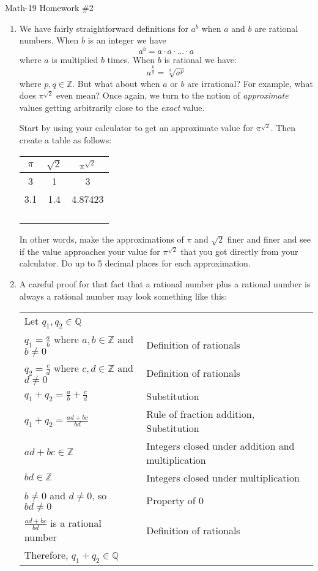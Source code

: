 \documentclass[letterpaper,12pt,fleqn]{article}
\begin{document}
\begin{center}
\Large Math-19 Homework \#2
\end{center}

\vspace{0.5in}

\begin{enumerate}
\item We have fairly straightforward definitions for $a^b$ when $a$ and $b$ are
rational numbers. When $b$ is an integer we have
\[a^b=a\cdot a\cdot \ldots \cdot a\]
where $a$ is multiplied $b$ times. When $b$ is rational we have:
\[a^{\frac{p}{q}}=\sqrt[q]{a^p}\]
where $p,q\in\mathbb{Z}$. But what about when $a$ or $b$ are irrational? For
example, what does $\pi^{\sqrt{2}}$ even mean? Once again, we turn to the notion
of \emph{approximate} values getting arbitrarily close to the \emph{exact}
value.

Start by using your calculator to get an approximate value for $\pi^{\sqrt{2}}$.
Then create a table as follows:

\begin{tabular}{|c|c|c|}
\hline
$\pi$ & $\sqrt{2}$ & $\pi^{\sqrt{2}}$ \\
\hline
3 & 1 & 3 \\
\hline
3.1 & 1.4 & 4.87423 \\
\hline
 & & \\
\hline
 & & \\
\hline
 & & \\
\hline
 & & \\
\hline
\end{tabular}

In other words, make the approximations of $\pi$ and $\sqrt{2}$ finer and
finer and see if the value approaches your value for $\pi^{\sqrt{2}}$ that you
got directly from your calculator. Do up to 5 decimal places for each
approximation.

\item A careful proof for that fact that a rational number plus a rational
number is always a rational number may look something like this:

\begin{tabular}{ll}
Let $q_1,q_2\in\mathbb{Q}$ & \\
$q_1=\frac{a}{b}$ where $a,b\in\mathbb{Z}$ and $b\ne0$ &
    Definition of rationals \\
$q_2=\frac{c}{d}$ where $c,d\in\mathbb{Z}$ and $d\ne0$ &
    Definition of rationals \\
$q_1+q_2=\frac{a}{b}+\frac{c}{d}$ & Substitution \\
$q_1+q_2=\frac{ad+bc}{bd}$ & Rule of fraction addition, Substitution \\
$ad+bc\in\mathbb{Z}$ & Integers closed under addition and multiplication \\
$bd\in\mathbb{Z}$ & Integers closed under multiplication \\
$b\ne0$ and $d\ne0$, so $bd\ne0$ & Property of 0 \\
$\frac{ad+bc}{bd}$ is a rational number & Definition of rationals \\
Therefore, $q_1+q_2\in\mathbb{Q}$ & \\
\end{tabular}


\end{enumerate}
\end{document}
